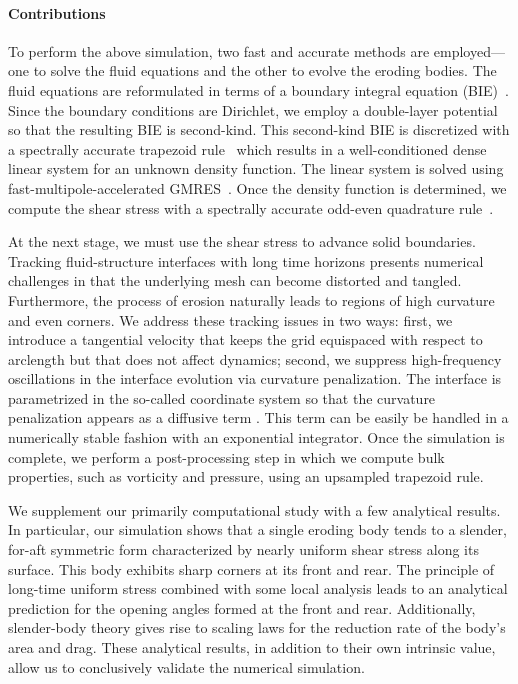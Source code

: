 \documentclass[preprint, 10pt]{elsarticle}
\begin{document}
\paragraph{Contributions}
To perform the above simulation, two fast and accurate methods are
employed---one to solve the fluid equations and the other to evolve the
eroding bodies.  The fluid equations are reformulated in terms of a boundary integral equation (BIE)~\cite{poz1992}.  Since the boundary conditions are Dirichlet, we employ a double-layer potential so that the resulting BIE is second-kind.  This second-kind BIE is discretized with a spectrally accurate trapezoid rule~\cite{tre-wei2014} which results in a well-conditioned dense linear system for an unknown density function. The linear system is solved using fast-multipole-accelerated GMRES~\cite{saa-sch1986}.  Once the density function is determined, we compute the shear stress with a spectrally accurate odd-even quadrature rule~\cite{sid-isr1988}.

At the next stage, we must use the shear stress to advance solid boundaries. Tracking fluid-structure interfaces with long time horizons presents numerical challenges in that the underlying mesh can become distorted and tangled. Furthermore, the process of erosion naturally leads to regions of high curvature and even corners.  We address these tracking issues in two ways: first, we introduce a tangential velocity that keeps the grid equispaced with respect to arclength but that does not affect dynamics; second, we suppress high-frequency oscillations in the interface evolution via curvature penalization. The interface is parametrized in the so-called {\thL} coordinate system so that the curvature penalization appears as a diffusive term \cite{hou-low-she1994}. This term can be easily be handled in a numerically stable fashion with an exponential integrator.  Once the simulation is complete, we perform a post-processing step in which we compute bulk properties, such as vorticity and pressure, using an upsampled trapezoid rule.  

We supplement our primarily computational study with a few analytical results. In particular, our simulation shows that a single eroding body tends to a slender, for-aft symmetric form characterized by nearly uniform shear stress along its surface. This body exhibits sharp corners at its front and rear. The principle of long-time uniform stress combined with some local analysis leads to an analytical prediction for the opening angles formed at the front and rear. Additionally, slender-body theory gives rise to scaling laws for the reduction rate of the body's area and drag. These analytical results, in addition to their own intrinsic value, allow us to conclusively validate the numerical simulation.
\end{document}
